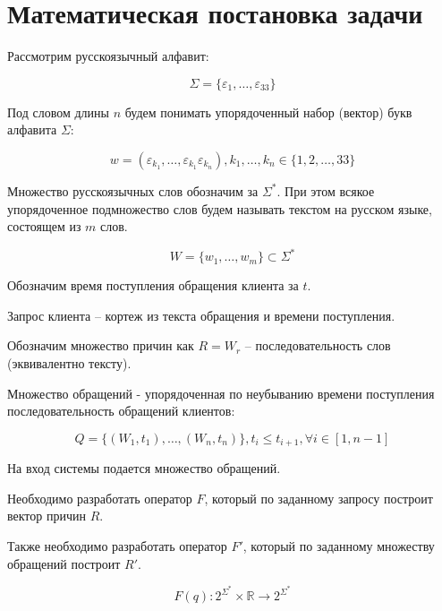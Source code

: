\documentclass[a4paper,12pt,preview]{report} %
\begin{document}
	\newpage
	
	\section{Математическая постановка задачи}
	
	Рассмотрим русскоязычный алфавит:
	
	\begin{equation}
	\Sigma = \{ \varepsilon_1, \dots, \varepsilon_{33}  \}
	\end{equation}
	
	Под словом длины $n$ будем понимать упорядоченный набор (вектор) букв алфавита $\Sigma$:
	
	\begin{equation}
	w = (\varepsilon_{k_1}, \dots, \varepsilon_{k_1}\varepsilon_{k_n}), k_1, \dots, k_n \in \{ 1, 2, \dots, 33\}
	\end{equation}
	
	Множество русскоязычных слов обозначим за $\Sigma^\ast$. При этом всякое упорядоченное подмножество слов будем называть текстом на русском языке, состоящем из $m$ слов.
	
	\begin{equation}
	W = \{w_1, \dots, w_m\} \subset \Sigma^\ast
	\end{equation}
	
	Обозначим время поступления обращения клиента за $t$.
	
	Запрос клиента -- кортеж из текста обращения и времени поступления.
	
	Обозначим множество причин как $R = W_r$ -- последовательность слов (эквивалентно тексту).
	
	Множество обращений - упорядоченная по неубыванию  времени поступления последовательность обращений клиентов:
	
	\begin{equation}
	Q = \{(W_1, t_1), \dots, (W_n, t_n)\}, t_i \leq t_{i+1}, \forall i \in [1, n-1]
	\end{equation} 
	
	На вход системы подается множество обращений.
	
	Необходимо разработать оператор $F$, который по заданному запросу построит вектор причин $R$.
	
	Также необходимо разработать оператор $F'$, который по заданному множеству обращений построит $R'$.
	
	
	\begin{equation}
	F(q) : 2^{\Sigma^\ast} \times \mathbb{R} \rightarrow 2^{\Sigma^\ast}
	\end{equation}  
	
\end{document}
